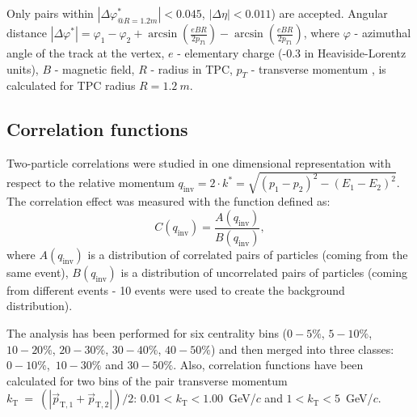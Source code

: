Only pairs within  $|\Delta\varphi^*_{@R=1.2m}| < 0.045$, $|\Delta\eta| < 0.011$) are accepted.  Angular distance $|\Delta\varphi^*| = \varphi_1 - \varphi_2 + \arcsin(\frac{e B R}{2 p_{T1}}) - \arcsin(\frac{e B R}{2 p_{T1}})$, where $\varphi$ - azimuthal angle of the track at the vertex, $e$ - elementary charge (-0.3 in Heaviside-Lorentz units), $B$ - magnetic field, $R$ - radius in TPC, $p_T$ - transverse momentum ,  is calculated for TPC radius $R = 1.2~m$.


\subsection{Correlation functions}

Two-particle correlations were studied in one dimensional representation with respect to the relative momentum  $q_{\mathrm{inv}}=2 \cdot k^{*} = \sqrt{(p_1-p_2)^2-(E_1-E_2)^2}$. The correlation effect was measured with the function defined as:
\begin{equation}
  C(q_{\mathrm{inv}}) = \frac{A(q_{\mathrm{inv}})}{B(q_{\mathrm{inv}})},
\end{equation}
where $A(q_{\mathrm{inv}})$ is a distribution of correlated pairs of particles (coming from the same event), $B(q_{\mathrm{inv}})$ is a distribution of uncorrelated pairs of particles (coming from different events - 10 events were used to create the background distribution).


The analysis has been performed for six centrality bins ($0-5\%$, $5-10\%$, $10-20\%$, $20-30\%$, $30-40\%$, $40-50\%$) and then merged into three classes: $0-10\%$,~$10-30\%$ and $30-50\%$. Also, correlation functions have been calculated for two bins of the pair transverse momentum $k_{\mathrm{T}}~=~(|\vec{p}_{\mathrm{T,1}}+\vec{p}_{\mathrm{T,2}}|)/2$: $0.01<k_{\mathrm{T}}<1{.}00$~GeV/$c$ and $1 < k_{\mathrm{T}}<5$~GeV/$c$.

